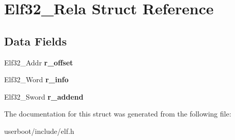 \hypertarget{structElf32__Rela}{}\section{Elf32\+\_\+\+Rela Struct Reference}
\label{structElf32__Rela}
\subsection*{Data Fields}
\begin{DoxyCompactItemize}
\item 
Elf32\+\_\+\+Addr {\bfseries r\+\_\+offset}\hypertarget{structElf32__Rela_aa850a306ee7fa3935a9f8c3d1aae4e51}{}\label{structElf32__Rela_aa850a306ee7fa3935a9f8c3d1aae4e51}

\item 
Elf32\+\_\+\+Word {\bfseries r\+\_\+info}\hypertarget{structElf32__Rela_ac3a79d3f04209c33ddb4c36d07e68a79}{}\label{structElf32__Rela_ac3a79d3f04209c33ddb4c36d07e68a79}

\item 
Elf32\+\_\+\+Sword {\bfseries r\+\_\+addend}\hypertarget{structElf32__Rela_a1952286a900648afb9029c68a8bcea4d}{}\label{structElf32__Rela_a1952286a900648afb9029c68a8bcea4d}

\end{DoxyCompactItemize}


The documentation for this struct was generated from the following file\+:\begin{DoxyCompactItemize}
\item 
userboot/include/elf.\+h\end{DoxyCompactItemize}

